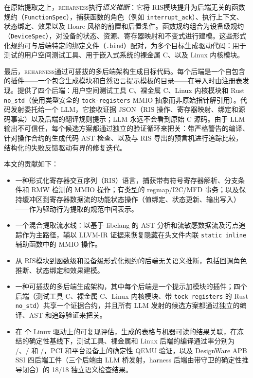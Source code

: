 \documentclass[sigplan, screen, review, anonymous]{acmart}
\newcommand{\reharness}{\textsc{reharness}}
\newcommand{\rislang}{RIS}
\begin{document}
在原始提取之上，\reharness 执行\emph{语义推断}：它将 \rislang 模块提升为后端无关的函数规约（\texttt{FunctionSpec}），捕获函数的角色（例如 \texttt{interrupt\_ack}）、执行上下文、状态绑定、效果以及 Hoare 风格的前置和后置条件。函数规约组合为设备级规约（\texttt{DeviceSpec}），对设备的状态、资源、寄存器映射和不变式进行建模。这些形式化规约可与后端特定的绑定文件（\texttt{.bind}）配对，为多个目标生成驱动代码：用于测试的用户空间测试工具、用于嵌入式系统的裸金属 C、以及 Linux 内核模块。

最后，\reharness 通过可插拔的多后端架构生成目标代码。每个后端是一个自包含的插件——一个包含生成模块和自然语言提示模板的目录——在导入时由注册表发现。提供了四个后端：用户空间测试工具 C、裸金属 C、Linux 内核模块和 Rust \texttt{no\_std}（使用类型安全的 \texttt{tock-registers} MMIO 抽象而非原始指针解引用）。代码发射委托给一个 LLM，它接收证据 JSON（RIS 操作、寄存器映射、绑定和源码事实）以及后端的翻译规则提示；LLM 永远不会看到原始 C 源码。由于 LLM 输出不可信任，每个候选方案都通过独立的验证循环来把关：带严格警告的编译、针对操作合约的生成代码 AST 检查、以及与 RIS 导出的预言机进行追踪比较，结构化的失败反馈驱动有界的修复迭代。

本文的贡献如下：

\begin{itemize}
\item 一种形式化寄存器交互序列（\rislang）语言，捕获带有符号寄存器解析、分支条件和 RMW 检测的 MMIO 操作；有类型的 regmap/I2C/MFD 事务；以及保持缓冲区到寄存器数据流的功能状态操作（值绑定、状态更新、输出写入）——作为驱动行为提取的规范中间表示。
\item 一个混合提取流水线：以基于 libclang 的 AST 分析和流敏感数据流及污点追踪作为主路径，辅以 LLVM-IR 证据来恢复隐藏在头文件内联 \texttt{static inline} 辅助函数中的 MMIO 操作。
\item 从 \rislang 模块到函数级和设备级形式化规约的后端无关语义推断，包括回调角色推断、状态绑定和效果建模。
\item 一种可插拔的多后端生成架构，其中每个后端是一个提示加模块的插件；四个后端（测试工具 C、裸金属 C、Linux 内核模块、带 \texttt{tock-registers} 的 Rust \texttt{no\_std}）共享一个证据合约，并且所有 LLM 发射的候选方案都通过独立的编译、AST 和追踪验证来把关。
\item 在 \EvalDrivers{} 个 Linux 驱动上的可复现评估，生成的表格与机器可读的结果关联，在冻结的确定性基线下，测试工具、裸金属和 Linux 后端的编译通过率分别为 \HarnessCompileCount{}/\EvalDrivers{}、\BaremetalCompileCount{}/\EvalDrivers{} 和 \LinuxCompileCount{}/\EvalDrivers{}，PCI 和平台设备上的确定性 QEMU 验证，以及 DesignWare APB SSI 四后端工件（三个后端由 LLM 桥发射，harness 后端由带守卫的确定性推导闭合）的 18/18 独立语义检查结果。
\end{itemize}
\end{document}
